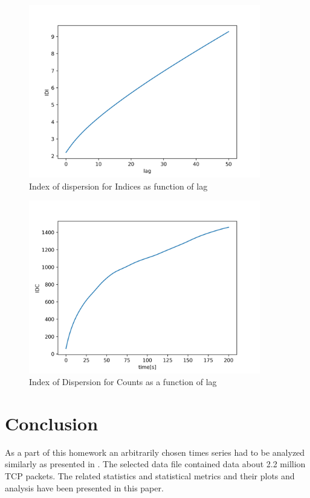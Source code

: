 \documentclass[a4paper]{article}
\begin{document}
\begin{figure}[H]
    \centering
    \includegraphics[width=0.9\textwidth]{figures/idi.png}
    \caption{Index of dispersion for Indices as function of lag}
    \label{fig:idi}
\end{figure}

\begin{figure}[H]
    \centering
    \includegraphics[width=0.9\textwidth]{figures/idc.png}
    \caption{Index of Dispersion for Counts as a function of lag}
    \label{fig:idc}
\end{figure}
	
	
\section{Conclusion}

As a part of this homework an arbitrarily chosen times series had to be analyzed similarly as presented in \cite{MolnarOnburst}. 
The selected data file contained data about 2.2 million TCP packets. The related statistics and statistical metrics and their plots and analysis have been presented in this paper.



\end{document}
